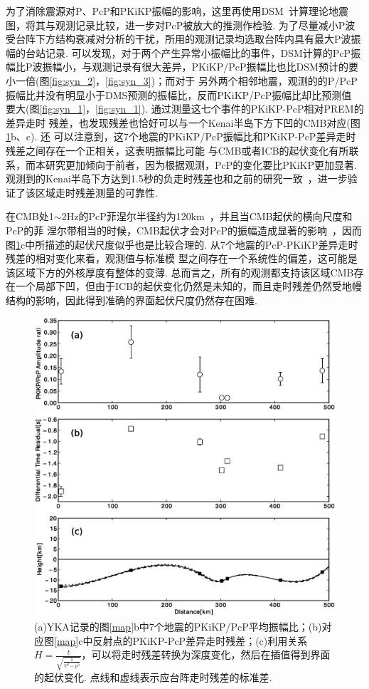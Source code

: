 为了消除震源对P、PcP和PKiKP振幅的影响，这里再使用DSM~\citep{Takeuchi1996,Kawai2006}计算理论地震图，将其与观测记录比较，进一步对PcP被放大的推测作检验. 为了尽量减小P波受台阵下方结构衰减对分析的干扰，所用的观测记录均选取台阵内具有最大P波振幅的台站记录. 可以发现，对于两个产生异常小振幅比的事件，DSM计算的PcP振幅比P波振幅小，与观测记录有很大差异，PKiKP/PcP振幅比也比DSM预计的要小一倍(图\ref{fig:syn_2}，\ref{fig:syn_3})；而对于
另外两个相邻地震，观测的的P/PcP振幅比并没有明显小于DMS预测的振幅比，反而PKiKP/PcP振幅比却比预测值
要大(图\ref{fig:syn_1}，\ref{fig:syn_1}). 通过测量这七个事件的PKiKP-PcP相对PREM的差异走时
残差，也发现残差也恰好可以与一个Kenai半岛下方下凹的CMB对应(图\ref{fig:topo}b、c). 还
可以注意到，这7个地震的PKiKP/PcP振幅比和PKiKP-PcP差异走时残差之间存在一个正相关，这表明振幅比可能
与CMB或者ICB的起伏变化有所联系，而本研究更加倾向于前者，因为根据观测，PcP的变化要比PKiKP更加显著. 
观测到的Kenai半岛下方达到1.5秒的负走时残差也和之前的研究一致~\citep{Koper2004a,Waszek2015a}，进一步验证了该区域走时残差测量的可靠性. 

在CMB处1$\sim$2Hz的PcP菲涅尔半径约为120km~\citep{Tkalcic2009}，并且当CMB起伏的横向尺度和PcP的菲
涅尔带相当的时候，CMB起伏才会对PcP的振幅造成显著的影响~\citep{Wu2014a}，因而图\ref{fig:topo}c中所描述的起伏尺度似乎也是比较合理的. 从7个地震的PcP-PKiKP差异走时残差的相对变化来看，观测值与标准模
型之间存在一个系统性的偏差，这可能是该区域下方的外核厚度有整体的变薄. 总而言之，所有的观测都支持该区域CMB存在一个局部下凹，但由于ICB的起伏变化仍然是未知的，而且走时残差仍然受地幔结构的影响，因此得到准确的界面起伏尺度仍然存在困难.

\begin{figure}
\centering
\includegraphics[width=0.7\linewidth]{fig/chap3/topo}
\caption{(a)YKA记录的图\ref{map}b中7个地震的PKiKP/PcP平均振幅比；(b)对应图\ref{map}c中反射点的PKiKP-PcP差异走时残差；(c)利用关系$H=\frac{t}{\sqrt{\frac{1}{V^2-p^2}}}$，可以将走时残差转换为深度变化，然后在插值得到界面的起伏变化. 点线和虚线表示应台阵走时残差的标准差. }
\label{fig:topo}
\end{figure}

